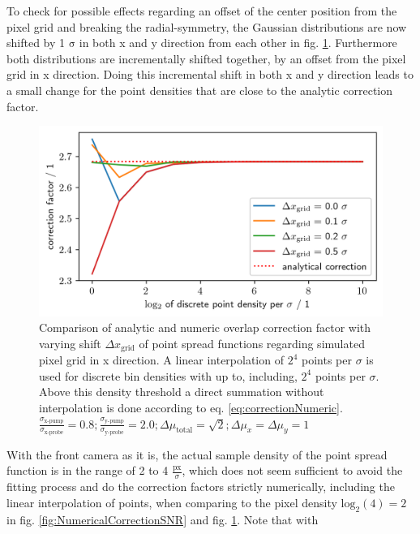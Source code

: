 \documentclass[twoside,openright,listof=numbered]{scrreprt}
\begin{document}
To check for possible effects regarding an offset of the center position from the pixel grid and breaking the radial-symmetry, the Gaussian distributions are now shifted by 1 $\mathrm{\sigma}$ in both x and y direction from each other in fig. \ref{fig:NumericalCorrectionShift}. Furthermore both distributions are incrementally shifted together, by an offset from the pixel grid in x direction. Doing this incremental shift in both x and y direction leads to a small change for the point densities that are close to the analytic correction factor. 

\begin{figure}[h]
\centering
\includegraphics[width=0.9\linewidth]{images/NumericalCorrectionShiftedBeams_interpolation.png}
\caption[Comparison of analytic and numeric overlap correction factor with varying shift of point spread functions regarding simulated pixel grid in x direction.]{Comparison of analytic and numeric overlap correction factor with varying shift $\Delta x_\text{grid}$ of point spread functions regarding simulated pixel grid in x direction. A linear interpolation of $2^4$ points per $\sigma$ is used for discrete bin densities with up to, including, $2^4$ points per $\sigma$. Above this density threshold a direct summation without interpolation is done according to eq. \ref{eq:correctionNumeric}.
\\$\frac{\sigma_\text{x-pump}}{\sigma_\text{x-probe}}=0.8;\frac{\sigma_\text{y-pump}}{\sigma_\text{y-probe}}=2.0;\Delta\mu_\text{total} = \sqrt{2}; \Delta\mu_{x} = \Delta\mu_y = 1$\label{fig:NumericalCorrectionShift}}
\end{figure}

With the front camera as it is, the actual sample density of the point spread function is in the range of 2 to 4 $\frac{\text{px}}{\sigma}$, which does not seem sufficient to avoid the fitting process and do the correction factors strictly numerically, including the linear interpolation of points, when comparing to the pixel density $\mathrm{log_2(4) = 2}$ in fig. \ref{fig:NumericalCorrectionSNR} and fig. \ref{fig:NumericalCorrectionShift}. Note that with
\end{document}
